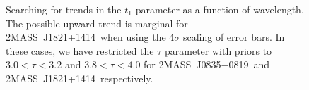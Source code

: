 \documentclass[manuscript]{aastex6}
\newcommand{\sha}{2MASS~J0835$-$0819}
\newcommand{\shb}{2MASS~J1821+1414}
\begin{document}
\begin{figure}[!t]
\centering
{}
	\caption{Searching for trends in the $t_1$ parameter as a function of wavelength. The possible upward trend is marginal for \shb\ when using the 4$\sigma$ scaling of error bars. In these cases, we have restricted the $\tau$ parameter with priors to $3.0 < \tau < 3.2$ and $3.8 < \tau < 4.0$ for \sha\ and \shb\ respectively.}
	\label{fig:t1SpecTauRestrict}
	\vspace{0.1in}
\end{figure} 
\end{document}
